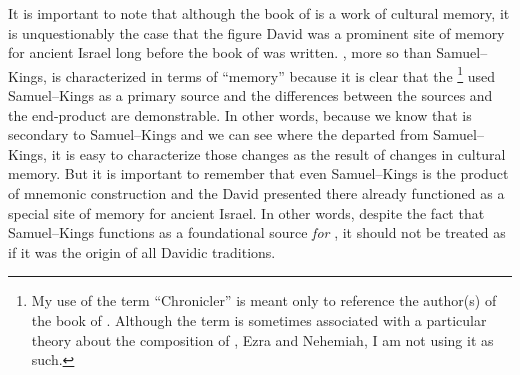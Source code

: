 It is important to note that although the book of \chronicles is a work of cultural memory, it is unquestionably the case that the figure David was a prominent site of memory for ancient Israel long before the book of \chronicles was written. \chronicles, more so than Samuel--Kings, is characterized in terms of ``memory'' because it is clear that the \chronicler%
    \footnote{My use of the term ``Chronicler'' is meant only to reference the author(s) of the book of \chronicles. Although the term is sometimes associated with a particular theory about the composition of \chronicles, Ezra and Nehemiah, I am not using it as such.}
used Samuel--Kings as a primary source and the differences between the sources and the end-product are demonstrable. In other words, because we know that \chronicles is secondary to Samuel--Kings and we can see where the \chronicler departed from Samuel--Kings, it is easy to characterize those changes as the result of changes in cultural memory. But it is important to remember that even Samuel--Kings is the product of mnemonic construction and the David presented there already functioned as a special site of memory for ancient Israel. In other words, despite the fact that Samuel--Kings functions as a foundational source \emph{for \chronicles}, it should not be treated as if it was the origin of all Davidic traditions.\autocite{frohlich_frohlich2019}

